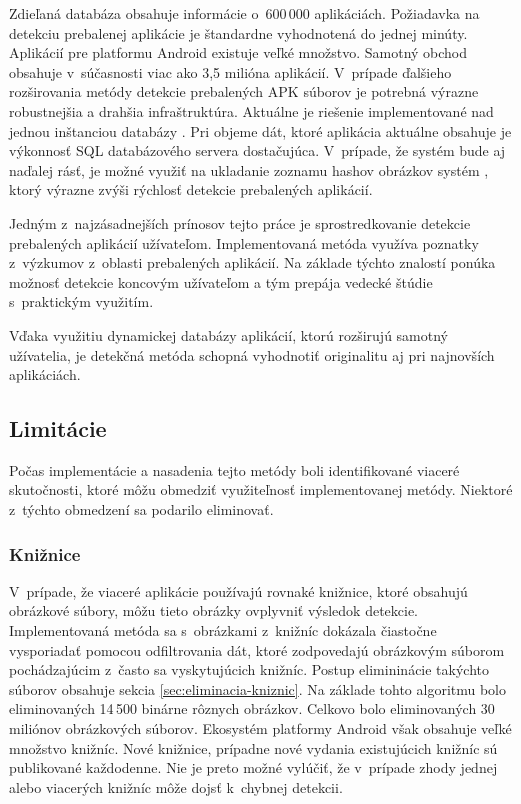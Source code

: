 Zdieľaná databáza obsahuje informácie o~600\,000 aplikáciách. Požiadavka na detekciu prebalenej aplikácie je štandardne vyhodnotená do jednej minúty. Aplikácií pre platformu Android existuje veľké množstvo. Samotný obchod  obsahuje v~súčasnosti viac ako 3,5 milióna aplikácií. V~prípade ďalšieho rozširovania metódy detekcie prebalených APK súborov  je potrebná výrazne robustnejšia a drahšia infraštruktúra. Aktuálne je riešenie implementované nad jednou inštanciou databázy . Pri objeme dát, ktoré aplikácia aktuálne obsahuje je výkonnosť SQL databázového servera dostačujúca. V~prípade, že systém bude aj naďalej rásť, je možné využiť na ukladanie zoznamu hashov obrázkov systém , ktorý výrazne zvýši rýchlosť detekcie prebalených aplikácií. 

Jedným z~najzásadnejších prínosov tejto práce je sprostredkovanie detekcie prebalených aplikácií užívateľom. Implementovaná metóda využíva poznatky z~výzkumov z~oblasti prebalených aplikácií. Na základe týchto znalostí ponúka možnosť detekcie koncovým užívateľom a tým prepája vedecké štúdie s~praktickým využitím. 

Vďaka využitiu dynamickej databázy aplikácií, ktorú rozširujú samotný užívatelia, je detekčná metóda schopná vyhodnotiť originalitu aj pri najnovších aplikáciách.

\subsection{Limitácie}
Počas implementácie a nasadenia tejto metódy boli identifikované viaceré skutočnosti, ktoré môžu obmedziť využiteľnosť implementovanej metódy. Niektoré z~týchto obmedzení sa podarilo eliminovať.

\subsubsection{\textbf{Knižnice}}
V~prípade, že viaceré aplikácie používajú rovnaké knižnice, ktoré obsahujú obrázkové súbory, môžu tieto obrázky ovplyvniť výsledok detekcie. Implementovaná metóda sa s~obrázkami z~knižníc dokázala čiastočne vysporiadať pomocou odfiltrovania dát, ktoré zodpovedajú obrázkovým súborom pochádzajúcim z~často sa vyskytujúcich knižníc. Postup elimininácie takýchto súborov obsahuje sekcia \ref{sec:eliminacia-kniznic}. Na základe tohto algoritmu bolo eliminovaných 14\,500 binárne rôznych obrázkov. Celkovo bolo eliminovaných 30 miliónov obrázkových súborov. Ekosystém platformy Android však obsahuje veľké množstvo knižníc. Nové knižnice, prípadne nové vydania existujúcich knižníc sú publikované každodenne. Nie je preto možné vylúčiť, že v~prípade zhody jednej alebo viacerých knižníc môže dojsť k~chybnej detekcii.

